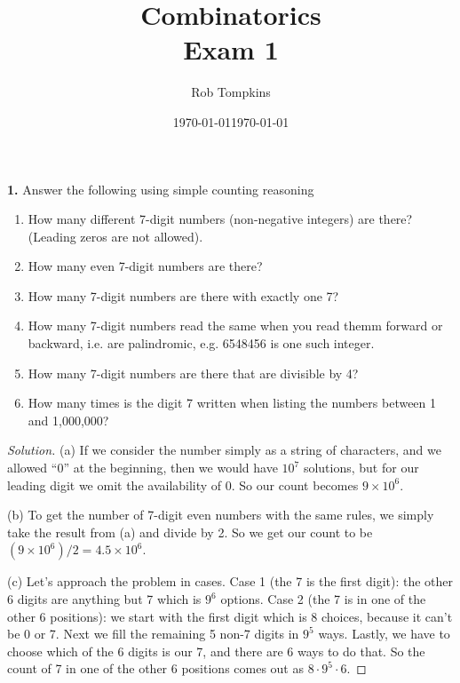 \documentclass[12pt]{amsart}
\title{Combinatorics\\Exam 1}
\author{Rob Tompkins}
\date{\today}
\newenvironment{solution}
{\begin{proof}[Solution]}
{\end{proof}}
\begin{document}
    \maketitle
    \date{\today}
    \begin{onehalfspace}
        \noindent\textbf{1.} Answer the following using simple counting reasoning
        \begin{enumerate}[label=(\alph*)]
            \item How many different 7-digit numbers (non-negative integers) are there?
                  (Leading zeros are not allowed).
            \item How many even 7-digit numbers are there?
            \item How many 7-digit numbers are there with exactly one 7?
            \item How many 7-digit numbers read the same when you read themm forward or backward, i.e. are palindromic,
                  e.g. 6548456 is one such integer.
            \item How many 7-digit numbers are there that are divisible by 4?
            \item How many times is the digit 7 written when listing the numbers between 1 and 1,000,000?
        \end{enumerate}
        \begin{solution}
            (a) If we consider the number simply as a string of characters, and we allowed ``0'' at the beginning,
            then we would have $10^7$ solutions, but for our leading digit we omit the availability of 0.
            So our count becomes $9\times10^6$.

            (b) To get the number of 7-digit even numbers with the same rules, we simply take the result from (a) and
            divide by 2.
            So we get our count to be $(9\times10^6)/2 = 4.5\times10^6$.

            (c) Let's approach the problem in cases.
            Case 1 (the 7 is the first digit): the other 6 digits are anything but 7 which is $9^6$ options.
            Case 2 (the 7 is in one of the other 6 positions): we start with the first digit which is 8 choices,
            because it can't be 0 or 7.
            Next we fill the remaining 5 non-7 digits in $9^5$ ways.
            Lastly, we have to choose which of the 6 digits is our 7, and there are 6 ways to do that.
            So the count of 7 in one of the other 6 positions comes out as $8\cdot 9^5\cdot 6$.


\end{solution}
\end{onehalfspace}
\end{document}
